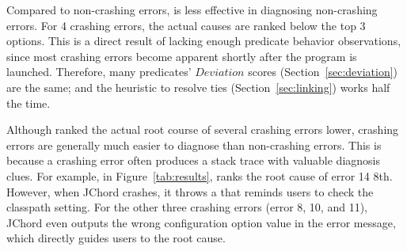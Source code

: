 
Compared to non-crashing errors, \ourtool is less effective
in diagnosing non-crashing errors. For 4 crashing errors,
the actual causes are ranked below the top 3 options.
This is a direct result of lacking enough predicate behavior observations,
since most crashing errors become apparent shortly
after the program is launched. Therefore, many predicates' $Deviation$ scores
 (Section~\ref{sec:deviation}) are the same; and the heuristic to resolve ties (Section~\ref{sec:linking})
works half the time.




Although \ourtool ranked the actual root course of several
crashing errors lower, crashing errors are generally much easier to diagnose than non-crashing errors.
This is because a crashing error often produces a stack trace with valuable diagnosis clues.
For example, in Figure~\ref{tab:results}, \ourtool ranks the root cause of
error 14  8th.
However, when JChord crashes, it throws a 
that reminds users to check the classpath setting. For the other three crashing errors (error 8, 10, and 11),
JChord even outputs the wrong configuration option value in the
error message, which
directly guides users to the root cause. 









